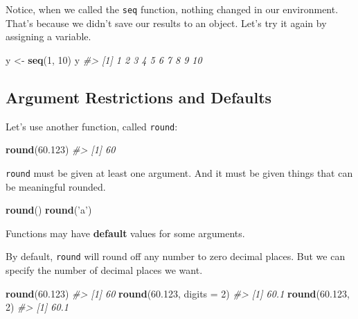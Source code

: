 \documentclass[]{book}
\newenvironment{Shaded}{\begin{snugshade}}{\end{snugshade}}
\newcommand{\KeywordTok}[1]{\textcolor[rgb]{0.13,0.29,0.53}{\textbf{#1}}}
\newcommand{\DataTypeTok}[1]{\textcolor[rgb]{0.13,0.29,0.53}{#1}}
\newcommand{\DecValTok}[1]{\textcolor[rgb]{0.00,0.00,0.81}{#1}}
\newcommand{\FloatTok}[1]{\textcolor[rgb]{0.00,0.00,0.81}{#1}}
\newcommand{\StringTok}[1]{\textcolor[rgb]{0.31,0.60,0.02}{#1}}
\newcommand{\CommentTok}[1]{\textcolor[rgb]{0.56,0.35,0.01}{\textit{#1}}}
\newcommand{\NormalTok}[1]{#1}
\begin{document}
Notice, when we called the \texttt{seq} function, nothing changed in our
environment. That's because we didn't save our results to an object.
Let's try it again by assigning a variable.

\begin{Shaded}
\begin{Highlighting}[]
\NormalTok{y <-}\StringTok{ }\KeywordTok{seq}\NormalTok{(}\DecValTok{1}\NormalTok{, }\DecValTok{10}\NormalTok{)}
\NormalTok{y}
\CommentTok{#>  [1]  1  2  3  4  5  6  7  8  9 10}
\end{Highlighting}
\end{Shaded}

\subsection{Argument Restrictions and
Defaults}\label{argument-restrictions-and-defaults}

Let's use another function, called \texttt{round}:

\begin{Shaded}
\begin{Highlighting}[]
\KeywordTok{round}\NormalTok{(}\FloatTok{60.123}\NormalTok{)}
\CommentTok{#> [1] 60}
\end{Highlighting}
\end{Shaded}

\texttt{round} must be given at least one argument. And it must be given
things that can be meaningful rounded.

\begin{Shaded}
\begin{Highlighting}[]
\KeywordTok{round}\NormalTok{()}
\KeywordTok{round}\NormalTok{(}\StringTok{'a'}\NormalTok{)}
\end{Highlighting}
\end{Shaded}

Functions may have \textbf{default} values for some arguments.

By default, \texttt{round} will round off any number to zero decimal
places. But we can specify the number of decimal places we want.

\begin{Shaded}
\begin{Highlighting}[]
\KeywordTok{round}\NormalTok{(}\FloatTok{60.123}\NormalTok{)}
\CommentTok{#> [1] 60}
\KeywordTok{round}\NormalTok{(}\FloatTok{60.123}\NormalTok{, }\DataTypeTok{digits =} \DecValTok{2}\NormalTok{)}
\CommentTok{#> [1] 60.1}
\KeywordTok{round}\NormalTok{(}\FloatTok{60.123}\NormalTok{, }\DecValTok{2}\NormalTok{)}
\CommentTok{#> [1] 60.1}
\end{Highlighting}
\end{Shaded}
\end{document}
